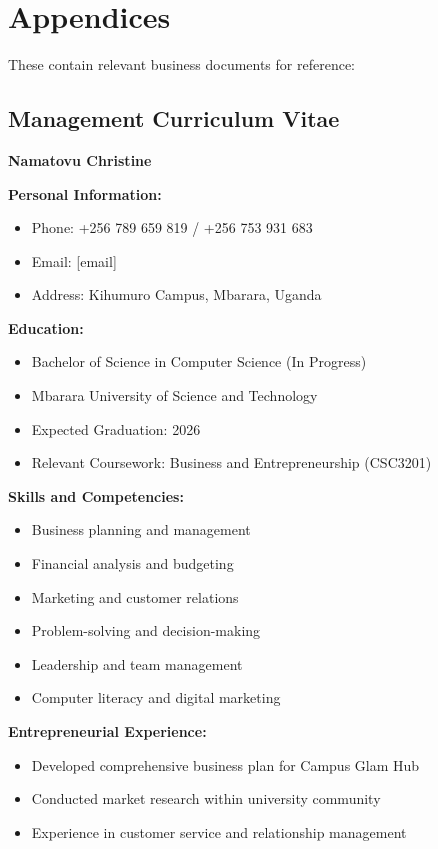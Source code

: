 \section{Appendices}

These contain relevant business documents for reference:

\subsection{Management Curriculum Vitae}

\textbf{Namatovu Christine}

\textbf{Personal Information:}
\begin{itemize}[leftmargin=2em]
    \item Phone: +256 789 659 819 / +256 753 931 683
    \item Email: [email]
    \item Address: Kihumuro Campus, Mbarara, Uganda
\end{itemize}

\textbf{Education:}
\begin{itemize}[leftmargin=2em]
    \item Bachelor of Science in Computer Science (In Progress)
    \item Mbarara University of Science and Technology
    \item Expected Graduation: 2026
    \item Relevant Coursework: Business and Entrepreneurship (CSC3201)
\end{itemize}

\textbf{Skills and Competencies:}
\begin{itemize}[leftmargin=2em]
    \item Business planning and management
    \item Financial analysis and budgeting
    \item Marketing and customer relations
    \item Problem-solving and decision-making
    \item Leadership and team management
    \item Computer literacy and digital marketing
\end{itemize}

\textbf{Entrepreneurial Experience:}
\begin{itemize}[leftmargin=2em]
    \item Developed comprehensive business plan for Campus Glam Hub
    \item Conducted market research within university community
    \item Experience in customer service and relationship management
\end{itemize}

